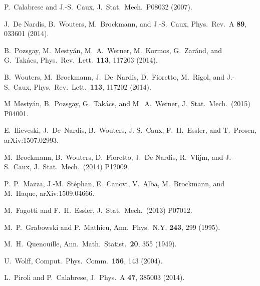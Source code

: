 \documentclass[11pt]{iopart}
\begin{document}
\begin{thebibliography}{99}
P.~Calabrese and J.-S.~Caux, J.\ Stat.\ Mech.\ P08032 (2007).

J.~De Nardis, B.~Wouters, M.~Brockmann, and J.-S.~Caux, Phys.\ Rev.\ A {\bf 89}, 
033601 (2014). 

B.~Pozsgay, M.~Mesty\'an, M.~A.~Werner, M.~Kormos, G.~Zar\'and, and G.~Tak\'acs,
Phys.\ Rev.\ Lett.\ {\bf 113}, 117203 (2014). 

B.~Wouters, M.~Brockmann, J.~De~Nardis, D.~Fioretto, M.~Rigol, and J.-S.~Caux, 
Phys.\ Rev.\ Lett.\ {\bf 113}, 117202 (2014). 

M~Mesty\'an, B.~Pozsgay, G.~Tak\'acs, and M.~A.~Werner, J.\ Stat.\ Mech.\ (2015) 
P04001.

E.~Ilieveski, J.~De~Nardis, B.~Wouters, J.-S.~Caux, F.~H.~Essler, and T.~Prosen, 
arXiv:1507.02993. 

M.~Brockmann, B.~Wouters, D.~Fioretto, J.~De Nardis, R.~Vlijm, and J.-S.~Caux, 
J.\ Stat.\ Mech.\ (2014) P12009. 

P.~P.~Mazza, J.-M.~St\'ephan, E.~Canovi, V.~Alba, M.~Brockmann, and M.~Haque, 
arXiv:1509.04666.

M.~Fagotti and F.~H.~Essler, J.\ Stat.\ Mech.\ (2013) P07012. 

M.~P.~Grabowski and P.~Mathieu, Ann.\ Phys.\ N.Y. {\bf 243},
299 (1995).

M.~H.~Quenouille, Ann.\ Math.\ Statist.\ {\bf 20}, 355 (1949).

U.~Wolff, Comput.\ Phys.\ Comm.\ {\bf 156}, 143 (2004). 

L.~Piroli and P.~Calabrese, J.\ Phys.\ A {\bf 47}, 385003 (2014). 

\end{thebibliography}
\end{document}
